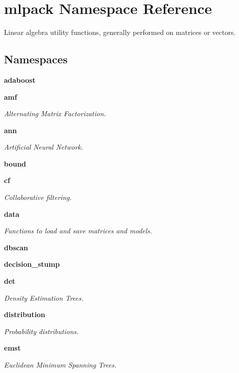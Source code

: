 \section{mlpack Namespace Reference}
\label{namespacemlpack}


Linear algebra utility functions, generally performed on matrices or vectors.  


\subsection*{Namespaces}
\begin{DoxyCompactItemize}
\item 
 {\bf adaboost}
\item 
 {\bf amf}
\begin{DoxyCompactList}\small\item\em Alternating Matrix Factorization. \end{DoxyCompactList}\item 
 {\bf ann}
\begin{DoxyCompactList}\small\item\em Artificial Neural Network. \end{DoxyCompactList}\item 
 {\bf bound}
\item 
 {\bf cf}
\begin{DoxyCompactList}\small\item\em Collaborative filtering. \end{DoxyCompactList}\item 
 {\bf data}
\begin{DoxyCompactList}\small\item\em Functions to load and save matrices and models. \end{DoxyCompactList}\item 
 {\bf dbscan}
\item 
 {\bf decision\+\_\+stump}
\item 
 {\bf det}
\begin{DoxyCompactList}\small\item\em Density Estimation Trees. \end{DoxyCompactList}\item 
 {\bf distribution}
\begin{DoxyCompactList}\small\item\em Probability distributions. \end{DoxyCompactList}\item 
 {\bf emst}
\begin{DoxyCompactList}\small\item\em Euclidean Minimum Spanning Trees. \end{DoxyCompactList}\item 

\end{DoxyCompactItemize}
